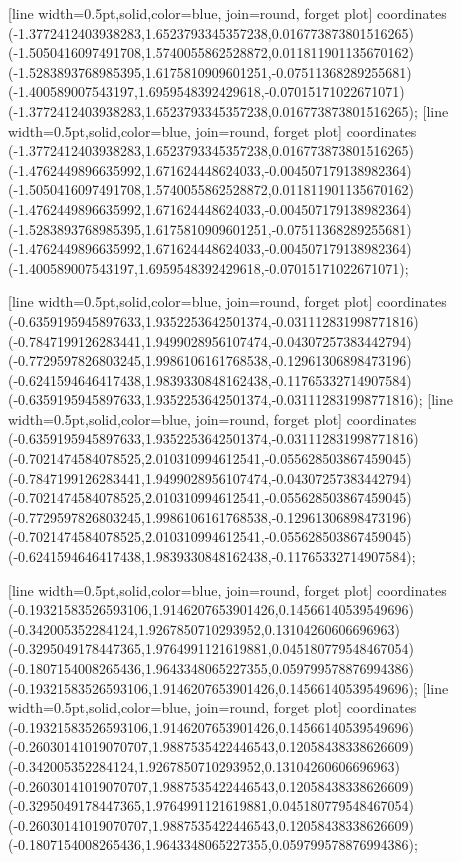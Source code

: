 [line width=0.5pt,solid,color=blue, join=round, forget plot] coordinates {(-1.3772412403938283,1.6523793345357238,0.016773873801516265) (-1.5050416097491708,1.5740055862528872,0.011811901135670162) (-1.5283893768985395,1.6175810909601251,-0.07511368289255681) (-1.400589007543197,1.6959548392429618,-0.07015171022671071) (-1.3772412403938283,1.6523793345357238,0.016773873801516265)};
[line width=0.5pt,solid,color=blue, join=round, forget plot] coordinates {(-1.3772412403938283,1.6523793345357238,0.016773873801516265) (-1.4762449896635992,1.671624448624033,-0.004507179138982364) (-1.5050416097491708,1.5740055862528872,0.011811901135670162) (-1.4762449896635992,1.671624448624033,-0.004507179138982364) (-1.5283893768985395,1.6175810909601251,-0.07511368289255681) (-1.4762449896635992,1.671624448624033,-0.004507179138982364) (-1.400589007543197,1.6959548392429618,-0.07015171022671071)};

[line width=0.5pt,solid,color=blue, join=round, forget plot] coordinates {(-0.6359195945897633,1.9352253642501374,-0.031112831998771816) (-0.7847199126283441,1.9499028956107474,-0.04307257383442794) (-0.7729597826803245,1.9986106161768538,-0.12961306898473196) (-0.6241594646417438,1.9839330848162438,-0.11765332714907584) (-0.6359195945897633,1.9352253642501374,-0.031112831998771816)};
[line width=0.5pt,solid,color=blue, join=round, forget plot] coordinates {(-0.6359195945897633,1.9352253642501374,-0.031112831998771816) (-0.7021474584078525,2.010310994612541,-0.055628503867459045) (-0.7847199126283441,1.9499028956107474,-0.04307257383442794) (-0.7021474584078525,2.010310994612541,-0.055628503867459045) (-0.7729597826803245,1.9986106161768538,-0.12961306898473196) (-0.7021474584078525,2.010310994612541,-0.055628503867459045) (-0.6241594646417438,1.9839330848162438,-0.11765332714907584)};

[line width=0.5pt,solid,color=blue, join=round, forget plot] coordinates {(-0.19321583526593106,1.9146207653901426,0.14566140539549696) (-0.342005352284124,1.9267850710293952,0.13104260606696963) (-0.3295049178447365,1.9764991121619881,0.045180779548467054) (-0.1807154008265436,1.9643348065227355,0.059799578876994386) (-0.19321583526593106,1.9146207653901426,0.14566140539549696)};
[line width=0.5pt,solid,color=blue, join=round, forget plot] coordinates {(-0.19321583526593106,1.9146207653901426,0.14566140539549696) (-0.26030141019070707,1.9887535422446543,0.12058438338626609) (-0.342005352284124,1.9267850710293952,0.13104260606696963) (-0.26030141019070707,1.9887535422446543,0.12058438338626609) (-0.3295049178447365,1.9764991121619881,0.045180779548467054) (-0.26030141019070707,1.9887535422446543,0.12058438338626609) (-0.1807154008265436,1.9643348065227355,0.059799578876994386)};

